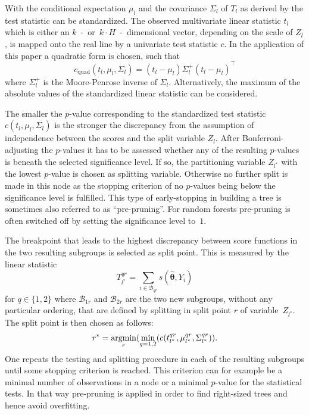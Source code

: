 \documentclass[aoas, preprint]{imsart}
\newcommand{\argmin}{\operatorname{argmin}\displaylimits}
\numberwithin{equation}{subsection}
\begin{document}
\begin{appendix}
With the conditional expectation $\mu_l$ and the covariance 
$\Sigma_l$ of $T_l$ as derived by 
\cite{Strasser+Weber:1999} the test statistic can be standardized. 
The observed multivariate linear statistic $t_l$ which is either an
$k$~-~or~$k \cdot H$~-~dimensional vector, depending on the scale of $Z_l$,
is mapped onto the real line by a univariate test statistic $c$.
In the application of this paper a quadratic form is chosen, such that
\begin{equation}
c_{\text{quad}}(t_l,\mu_l,\Sigma_l) = (t_l-\mu_l)\Sigma_l^+(t_l-\mu_l)^{\top}
\end{equation}
where $\Sigma_l^+$ is the Moore-Penrose inverse of $\Sigma_l$. Alternatively,
the maximum of the absolute values of the standardized linear statistic
can be considered.

The smaller the $p$-value corresponding to the standardized test 
statistic $c(t_{l},\mu_{l},\Sigma_{l})$ is the stronger the discrepancy 
from the assumption of independence between the scores and the split 
variable $Z_l$.
%
After Bonferroni-adjusting the $p$-values it has to be assessed whether
any of the resulting $p$-values is beneath the selected significance level. 
If so, the partitioning variable $Z_{l^\ast}$ with the lowest $p$-value 
is chosen as splitting variable. Otherwise no further split is made 
in this node as the stopping criterion of no $p$-values being below the 
significance level is fulfilled. This type of early-stopping in building
a tree is sometimes also referred to as ``pre-pruning''. For random forests
pre-pruning is often switched off by setting the significance level to~$1$.

The breakpoint that leads to the highest discrepancy between score functions 
in the two resulting subgroups is selected as split point. 
This is measured by the linear statistic
\begin{equation}
T_{l^{\ast}}^{qr} = \sum_{i \in \mathcal{B}_{qr}} s(\bm{\hat{\theta}}, Y_i)
\end{equation}
for $q \in \{1,2\}$ where $\mathcal{B}_{1r}$ and $\mathcal{B}_{2r}$ are the 
two new subgroups, without any particular ordering, that are defined by 
splitting in split point $r$ of variable~$Z_{l^{\ast}}$.
The split point is then chosen as follows:
\begin{equation}
r^{\ast} = \argmin_{r} (\min_{q=1,2}(c(t_{l^{\ast}}^{qr},\mu_{l^{\ast}}^{qr},\Sigma_{l^{\ast}}^{qr})).
\end{equation}
One repeats the testing and splitting procedure in each of the resulting 
subgroups until some stopping criterion is reached. This criterion 
can for example be a minimal number of observations in a node or a 
minimal $p$-value for the statistical tests. In that way pre-pruning
is applied in order to find right-sized trees and hence 
avoid overfitting.


\end{appendix}
\end{document}
